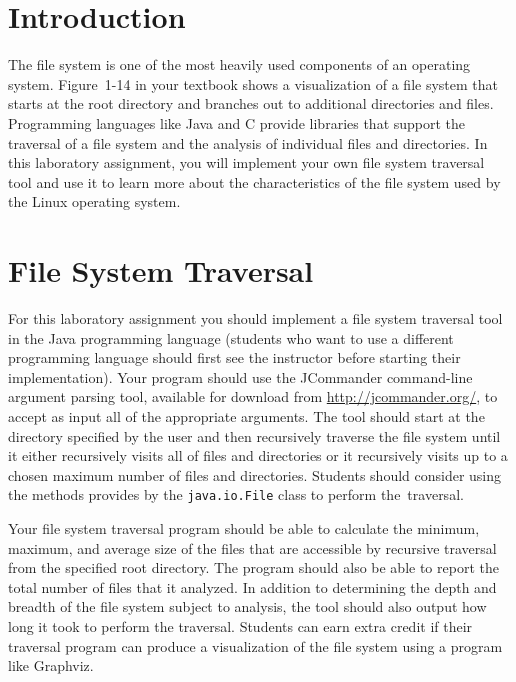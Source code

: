 

\usepackage[compact]{titlesec}



\section*{Introduction}

The file system is one of the most heavily used components of an operating system.  Figure~1-14 in your textbook shows a
visualization of a file system that starts at the root directory and branches out to additional directories and files.
Programming languages like Java and C provide libraries that support the traversal of a file system and the analysis of individual
files and directories. In this laboratory assignment, you will implement your own file system traversal tool and use it to learn
more about the characteristics of the file system used by the Linux operating system.

\section*{File System Traversal}

For this laboratory assignment you should implement a file system traversal tool in the Java programming language (students who
want to use a different programming language should first see the instructor before starting their implementation). Your program
should use the JCommander command-line argument parsing tool, available for download from \url{http://jcommander.org/}, to accept
as input all of the appropriate arguments. The tool should start at the directory specified by the user and then recursively
traverse the file system until it either recursively visits all of files and directories or it recursively visits up to a
chosen maximum number of files and directories. Students should consider using the methods provides by the {\tt java.io.File}
class to perform \mbox{the traversal}.

Your file system traversal program should be able to calculate the minimum, maximum, and average size of the files that are
accessible by recursive traversal from the specified root directory. The program should also be able to report the total number of
files that it analyzed.  In addition to determining the depth and breadth of the file system subject to analysis, the tool should
also output how long it took to perform the traversal. Students can earn extra credit if their traversal program can produce a
visualization of the file system using a program like Graphviz.

